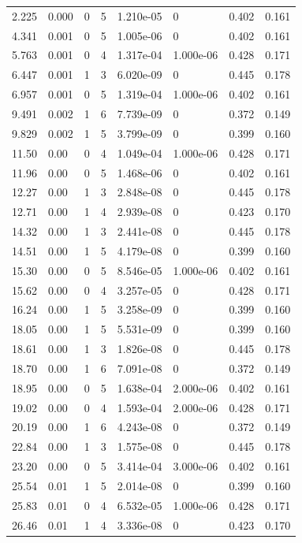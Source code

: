 \documentclass[preview]{standalone}
\begin{document}
{{\begin{tabular}{L{1.2cm}C{1.2cm} C{0.3cm}C{0.5cm} C{1.4cm}C{1.4cm} C{1.4cm}C{1.4cm}}
  2.225  &  0.000  & 0     &  5 &  1.210e-05  & 0  & 0.402 &  0.161   \\ 
  4.341  &  0.001  & 0     &  5 &  1.005e-06  & 0  & 0.402 &  0.161   \\ 
  5.763  &  0.001  & 0     &  4 &  1.317e-04  & 1.000e-06  & 0.428 &  0.171   \\ 
  6.447  &  0.001  & 1     &  3 &  6.020e-09  & 0  & 0.445 &  0.178   \\ 
  6.957  &  0.001  & 0     &  5 &  1.319e-04  & 1.000e-06  & 0.402 &  0.161   \\ 
  9.491  &  0.002  & 1     &  6 &  7.739e-09  & 0  & 0.372 &  0.149   \\ 
  9.829  &  0.002  & 1     &  5 &  3.799e-09  & 0  & 0.399 &  0.160   \\ 
  11.50  &  0.00  & 0     &  4 &  1.049e-04  & 1.000e-06  & 0.428 &  0.171   \\ 
  11.96  &  0.00  & 0     &  5 &  1.468e-06  & 0  & 0.402 &  0.161   \\ 
  12.27  &  0.00  & 1     &  3 &  2.848e-08  & 0  & 0.445 &  0.178   \\ 
  12.71  &  0.00  & 1     &  4 &  2.939e-08  & 0  & 0.423 &  0.170   \\ 
  14.32  &  0.00  & 1     &  3 &  2.441e-08  & 0  & 0.445 &  0.178   \\ 
  14.51  &  0.00  & 1     &  5 &  4.179e-08  & 0  & 0.399 &  0.160   \\ 
  15.30  &  0.00  & 0     &  5 &  8.546e-05  & 1.000e-06  & 0.402 &  0.161   \\ 
  15.62  &  0.00  & 0     &  4 &  3.257e-05  & 0  & 0.428 &  0.171   \\ 
  16.24  &  0.00  & 1     &  5 &  3.258e-09  & 0  & 0.399 &  0.160   \\ 
  18.05  &  0.00  & 1     &  5 &  5.531e-09  & 0  & 0.399 &  0.160   \\ 
  18.61  &  0.00  & 1     &  3 &  1.826e-08  & 0  & 0.445 &  0.178   \\ 
  18.70  &  0.00  & 1     &  6 &  7.091e-08  & 0  & 0.372 &  0.149   \\ 
  18.95  &  0.00  & 0     &  5 &  1.638e-04  & 2.000e-06  & 0.402 &  0.161   \\ 
  19.02  &  0.00  & 0     &  4 &  1.593e-04  & 2.000e-06  & 0.428 &  0.171   \\ 
  20.19  &  0.00  & 1     &  6 &  4.243e-08  & 0  & 0.372 &  0.149   \\ 
  22.84  &  0.00  & 1     &  3 &  1.575e-08  & 0  & 0.445 &  0.178   \\ 
  23.20  &  0.00  & 0     &  5 &  3.414e-04  & 3.000e-06  & 0.402 &  0.161   \\ 
  25.54  &  0.01  & 1     &  5 &  2.014e-08  & 0  & 0.399 &  0.160   \\ 
  25.83  &  0.01  & 0     &  4 &  6.532e-05  & 1.000e-06  & 0.428 &  0.171   \\ 
  26.46  &  0.01  & 1     &  4 &  3.336e-08  & 0  & 0.423 &  0.170   \\ 
\hline 
\end{tabular} 

}}
\end{document}
